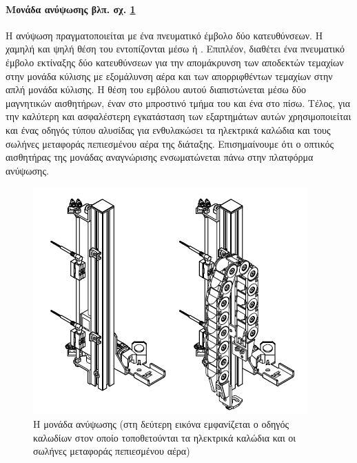 \documentclass[a4paper,12pt,twoside]{report}
\begin{document}
				\paragraph{Μονάδα ανύψωσης {\footnotesize βλπ. σχ. \ref{φωτ:Η μονάδα ανύψωσης από Festo}}} {Η ανύψωση πραγματοποιείται με ένα \gls{πνευματικό έμβολο} δύο κατευθύνσεων. Η χαμηλή και ψηλή θέση του εντοπίζονται μέσω  ή . Επιπλέον, διαθέτει ένα πνευματικό \gls{έμβολο εκτίναξης} δύο κατευθύνσεων για την απομάκρυνση των αποδεκτών τεμαχίων στην μονάδα κύλισης με εξομάλυνση αέρα και των απορριφθέντων τεμαχίων στην απλή μονάδα κύλισης. Η θέση του εμβόλου αυτού διαπιστώνεται μέσω δύο μαγνητικών αισθητήρων, έναν στο μπροστινό τμήμα του και ένα στο πίσω. Τέλος, για την καλύτερη και ασφαλέστερη εγκατάσταση των εξαρτημάτων αυτών χρησιμοποιείται και ένας οδηγός τύπου αλυσίδας για ενθυλακώσει τα ηλεκτρικά καλώδια και τους σωλήνες μεταφοράς πεπιεσμένου αέρα της διάταξης. Επισημαίνουμε ότι ο οπτικός αισθητήρας της μονάδας αναγνώρισης ενσωματώνεται πάνω στην πλατφόρμα ανύψωσης.
				}
				\begin{figure}[hp]
					\centering
					\includegraphics[scale=0.5]{TestingStationLiftingModule.png}
					\caption{Η μονάδα ανύψωσης \cite{FestoMPSTestingStationManual} (στη δεύτερη εικόνα εμφανίζεται ο οδηγός καλωδίων στον οποίο τοποθετούνται τα ηλεκτρικά καλώδια και οι σωλήνες μεταφοράς πεπιεσμένου αέρα)}
					\label{φωτ:Η μονάδα ανύψωσης από Festo}
				\end{figure}
				
\end{document}
